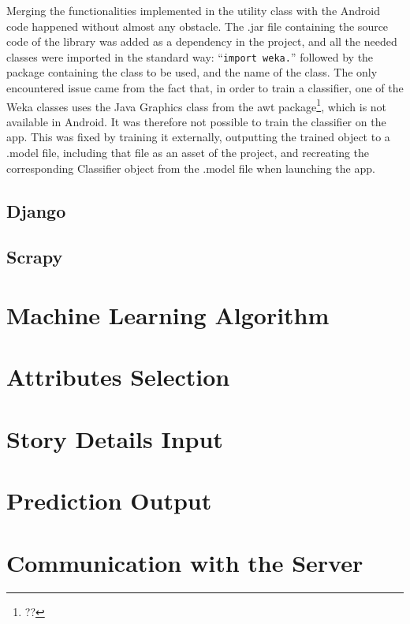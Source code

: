 \documentclass{mproj}
\begin{document}
Merging the functionalities implemented in the utility class with the Android code happened without almost any obstacle. The .jar file containing the source code of the library was added as a dependency in the project, and all the needed classes were imported in the standard way: ``\texttt{import weka.}'' followed by the package containing the class to be used, and the name of the class. The only encountered issue came from the fact that, in order to train a classifier, one of the Weka classes uses the Java Graphics class from the awt package\footnote{??}, which is not available in Android. It was therefore not possible to train the classifier on the app. This was fixed by training it externally, outputting the trained object to a .model file, including that file as an asset of the project, and recreating the corresponding Classifier object from the .model file when launching the app.

\subsection{Django}

\subsection{Scrapy}


\section{Machine Learning Algorithm}

\section{Attributes Selection}

\section{Story Details Input}

\section{Prediction Output}

\section{Communication with the Server}
\end{document}
